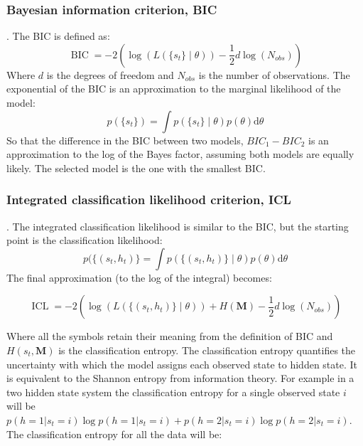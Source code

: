 \subsubsection{Bayesian information criterion, BIC}. The BIC is defined as: 
\begin{equation}
    \operatorname{BIC} = -2\left(\log{\left(L\left(\{s_t\}\middle|\theta\right)\right)} - \frac{1}{2}d\log{\left(N_{obs}\right)}\right)
\end{equation}
Where $d$ is the degrees of freedom and $N_{obs}$ is the number of observations.  
The exponential of the BIC is an approximation to the marginal likelihood of the model:
\begin{equation}
    p(\{s_t\}) = \int p\left(\{s_{t}\}\middle |\theta \right)p(\theta) \mathrm{d}\theta
\end{equation}
So that the difference in the BIC between two models, $BIC_{1}-BIC_{2}$ is an approximation to the log of the Bayes factor, assuming both models are equally likely. The selected model is the one with the smallest BIC. 

\subsubsection{Integrated classification likelihood criterion, ICL}. 
The integrated classification likelihood is similar to the BIC, but the starting point is the classification likelihood: 
\begin{equation}
    p(\{(s_t, h_t)\} = \int p\left(\{(s_{t}, h_{t})\}\middle |\theta \right)p(\theta) \mathrm{d}\theta
\end{equation}
The final approximation (to the log of the integral) becomes: 

\begin{equation}
        \operatorname{ICL} = -2\left(\log{\left(L\left(\{(s_t, h_{t})\}\middle|\theta\right)\right)} + H(\mathbf{M}) - \frac{1}{2}d\log{\left(N_{obs}\right)}\right)
\end{equation}

Where all the symbols retain their meaning from the definition of BIC and $H(s_{t}, \mathbf{M})$ is the classification entropy. The classification entropy quantifies the uncertainty with which the model assigns each observed state to hidden state. It is equivalent to the Shannon entropy from information theory. For example in a two hidden state system the classification entropy for a single observed state $i$ will be $p(h=1|s_t=i)\log{p(h=1|s_t=i)} + p(h=2|s_t=i)\log{p(h=2|s_t=i)}$. The classification entropy for all the data will be: 

